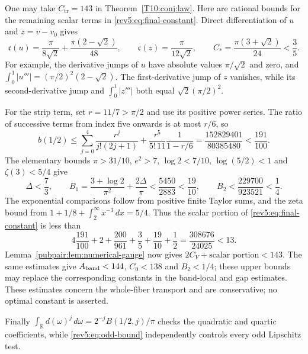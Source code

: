 \begin{remark}\label{rem:constants}
One may take $C_{\mathrm{tr}}=143$ in
Theorem~\ref{T10:conj:law}.  Here are rational bounds for the
remaining scalar terms in \eqref{rev5:eq:final-constant}.
Direct differentiation of $u$ and $z=v-v_0$ gives
\[
 \mathfrak c(u)=\frac{\pi}{8\sqrt2}
                   +\frac{\pi(2-\sqrt2)}{48},\qquad
 \mathfrak c(z)=\frac{\pi}{12\sqrt2},\qquad
 C_*=\frac{\pi(3+\sqrt2)}{24}<\frac35.
\]
For example, the derivative jumps of $u$ have absolute values
$\pi/\sqrt2$ and zero, and
$\int_0^1|u'''|=(\pi/2)^2(2-\sqrt2)$.
The first-derivative jump of $z$ vanishes, while its
second-derivative jump and $\int_0^1|z'''|$ both equal
$\sqrt2(\pi/2)^2$.

For the strip term, set $r=11/7>\pi/2$ and use its positive
power series.  The ratio of successive terms from index five
onwards is at most $r/6$, so
\[
 b(1/2)\le\sum_{j=0}^4\frac{r^j}{j!(2j+1)}
       +\frac{r^5}{5!\,11}\frac1{1-r/6}
 =\frac{152829401}{80385480}<\frac{191}{100}.
\]
The elementary bounds $\pi>31/10$, $e^2>7$,
$\log2<7/10$, $\log(5/2)<1$ and $\zeta(3)<5/4$ give
\[
 \Delta<\frac73,\qquad
 B_1=\frac{3+\log2}{\pi^2}+\frac{2\Delta}{\pi}
       <\frac{5450}{2883}<\frac{19}{10},\qquad
 B_2<\frac{229700}{923521}<\frac14.
\]
The exponential comparisons follow from positive finite Taylor
sums, and the zeta bound from
$1+1/8+\int_2^\infty x^{-3}\,dx=5/4$.
Thus the scalar portion of \eqref{rev5:eq:final-constant} is less
than
\[
 4\frac{191}{100}+2+\frac{200}{961}
      +\frac35+\frac{19}{10}+\frac12
 =\frac{308676}{24025}<13.
\]
Lemma~\ref{pubpair:lem:numerical-gauge} now gives
$2C_V+\text{scalar portion}<143$.  The same estimates give $A_{\rm band}<144$, $C_0<138$ and $B_2<1/4$;
these upper bounds may replace the corresponding constants in the
band-local and gap estimates.
These estimates concern the
whole-fiber transport and are conservative; no optimal constant
is asserted.
\end{remark}

Finally $\int_{\mathbb R}d(\omega)^j\,d\omega=2^{-j}B(1/2,j)/\pi$
checks the quadratic and quartic coefficients, while
\eqref{rev5:eq:odd-bound} independently controls every odd Lipschitz test.



